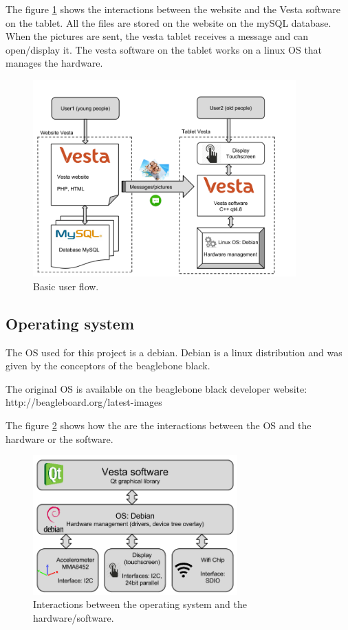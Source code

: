 \clearpage

The figure \ref{fig:user flow} shows the interactions between the website and the Vesta software on the tablet. All the files are stored on the website on the mySQL database. When the pictures are sent, the vesta tablet receives a message and can open/display it. The vesta software on the tablet works on a linux OS that manages the hardware.

\begin{figure}[!htb]
    \centering
    \includegraphics[width=0.9\textwidth,keepaspectratio]{chap/softFig/block_diagram_vesta2.png}
    \caption{Basic user flow.}
    \label{fig:user flow}
\end{figure}

\clearpage

\subsection{Operating system}
The OS used for this project is a debian. Debian is a linux distribution and was given by the conceptors of the beaglebone black.

The original OS is available on the beaglebone black developer website: http://beagleboard.org/latest-images

The figure \ref{fig:OS} shows how the are the interactions between the OS and the hardware or the software.

\begin{figure}[!htb]
    \centering
    \includegraphics[width=0.7\textwidth,keepaspectratio]{chap/softFig/first_diagram2}
    \caption{Interactions between the operating system and the hardware/software.}
    \label{fig:OS}
\end{figure}

